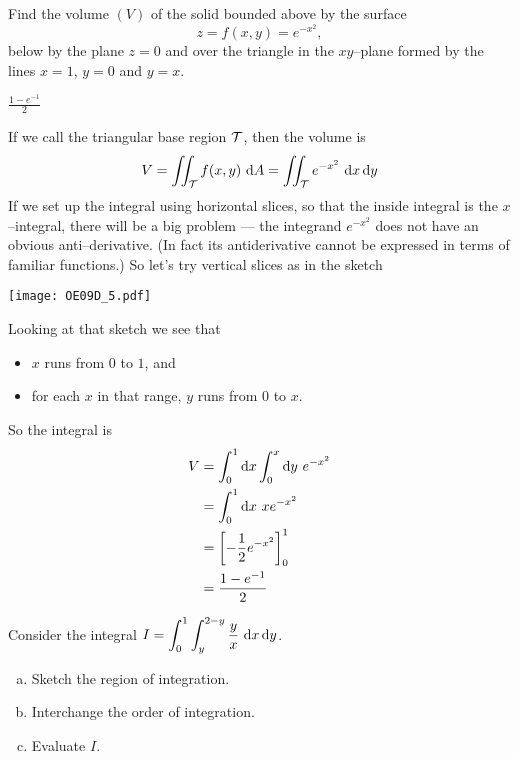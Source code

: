 \begin{question}[M200 2009D] %
Find the volume $(V)$ of the solid bounded above by the surface
\begin{equation*}
z = f (x,y) = e^{-x^2},
\end{equation*}
below by the plane $z = 0$ and over the triangle in the $xy$--plane
formed by the lines $x = 1$, $y = 0$ and $y = x$.

\end{question}

%

\begin{answer}
$\frac{1-e^{-1}}{2}$
\end{answer}

\begin{solution}
If we call the triangular base region $\mathcal{T}$, then the volume is
\begin{align*}
V=\iint_{\mathcal{T}} f(x,y)\ \mathrm{d}A = \iint_{\mathcal{T}} e^{-x^2}\ \mathrm{d}x\,\mathrm{d}y
\end{align*}
If we set up the integral using horizontal slices, so that the inside integral
is the $x$--integral, there will be a big problem --- the integrand 
$e^{-x^2}$ does not have an obvious anti--derivative. (In fact its
antiderivative cannot be expressed in terms of familiar functions.)
So let's try vertical slices as in the sketch 
\begin{center}
      \texttt{[image: OE09D\_5.pdf]}
\end{center}
Looking at that sketch we see that
\begin{itemize}
\item
$x$ runs from $0$ to $1$, and 
\item
for each $x$ in that range, $y$ runs from $0$ to $x$.
\end{itemize}
So the integral is
\begin{align*}
V&=\int_0^1\mathrm{d}x\int_0^x\mathrm{d}y\ e^{-x^2} \\
&=\int_0^1 \mathrm{d}x\ xe^{-x^2} \\
&=\left[-\frac{1}{2}e^{-x^2}\right]_0^1 \\
&=\frac{1-e^{-1}}{2}
\end{align*}

\end{solution}

\begin{question}[M200 2009D] %
Consider the integral 
   $\displaystyle I=\int_0^1 \int_y^{2-y}\frac{y}{x} \ \mathrm{d}x\,\mathrm{d}y$.

\begin{enumerate}[(a)]
\item
Sketch the region of integration.

\item 
Interchange the order of integration.

\item
Evaluate $I$.
\end{enumerate}
\end{question}

